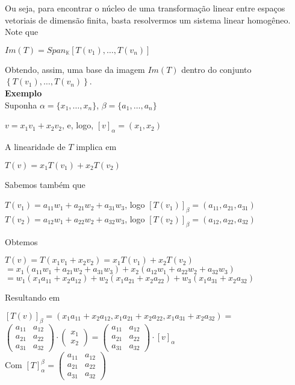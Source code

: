 \documentclass[12pt]{article}
\begin{document}
	Ou seja, para encontrar o núcleo de uma transformação linear entre espaços vetoriais de dimensão finita, basta resolvermos um sistema linear homogêneo.\\[10pt]
	Note que
	\begin{center}
		$Im(T) = Span_\mathbb{K} \left[ T(v_1), \dots, T(v_n) \right]$
	\end{center}
	Obtendo, assim, uma base da imagem $Im(T)$ dentro do conjunto $\left\lbrace T(v_1), \dots, T(v_n) \right\rbrace$.\\[10pt]
	\textbf{Exemplo\\}
	Suponha $\alpha = \lbrace x_1, \dots, x_n \rbrace$, $\beta = \lbrace a_1, \dots, a_n \rbrace$
	\begin{center}
		$v = x_1 v_1 + x_2 v_2$, e, logo, $[v]_\alpha = (x_1, x_2)$
	\end{center}
	A linearidade de $T$ implica em
	\begin{center}
		$T(v) = x_1 T(v_1) + x_2 T(v_2)$
	\end{center}
	Sabemos também que
	\begin{center}
		$T(v_1) = a_{11} w_1 + a_{21} w_2 + a_{31} w_3 $, logo $[T(v_1)]_\beta = (a_{11}, a_{21}, a_{31})$ \\
		$T(v_2) = a_{12} w_1 + a_{22} w_2 + a_{32} w_3 $, logo $[T(v_2)]_\beta = (a_{12}, a_{22}, a_{32})$
	\end{center}
	Obtemos
	\begin{center}
		$T(v) = T(x_1 v_1 + x_2 v_2) = x_1 T(v_1) + x_2 T(v_2)$\\
		$ = x_1 (a_{11} w_1 + a_{21} w_2 + a_{31} w_3) + x_2 (a_{12} w_1 + a_{22} w_2 + a_{32} w_3)$\\
		$ = w_1(x_1 a_{11} + x_2 a_{12}) + w_2(x_1 a_{21} + x_2 a_{22}) + w_3(x_1 a_{31} + x_2 a_{32}) $
	\end{center}
	Resultando em
	\begin{center}
		$[T(v)]_\beta = (x_1 a_{11} + x_2 a_{12}, x_1 a_{21} + x_2 a_{22}, x_1 a_{31} + x_2 a_{32}) = $\\[5pt]
		$\begin{pmatrix}
			a_{11} & a_{12} \\ a_{21} & a_{22} \\ a_{31} & a_{32}
		\end{pmatrix}
		\cdot
		\begin{pmatrix}
			x_1 \\ x_2
		\end{pmatrix}
		=
		\begin{pmatrix}
			a_{11} & a_{12} \\ a_{21} & a_{22} \\ a_{31} & a_{32}
		\end{pmatrix}
		\cdot
		[v]_\alpha
		$\\[5pt]
		Com $[T]_\alpha^\beta = \begin{pmatrix}
			a_{11} & a_{12} \\ a_{21} & a_{22} \\ a_{31} & a_{32}
		\end{pmatrix}$
	\end{center}
\end{document}
